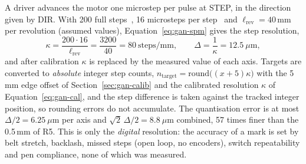 A driver advances the motor one microstep per pulse at STEP, in the direction given by DIR.
With 200 full steps~\cite{stepperds}, 16 microsteps per step~\cite{a4988ds} and $\ell_{\mathrm{rev}}=40$\,mm per revolution (assumed values), Equation~\ref{eq:gan-spm} gives the step resolution,
\begin{equation}
\kappa=\frac{200\cdot16}{\ell_{\mathrm{rev}}}=\frac{3200}{40}=80\ \mathrm{steps/mm},\qquad\Delta=\frac1\kappa=12.5\ \mu\mathrm{m},
\label{eq:gan-spm}
\end{equation}
and after calibration $\kappa$ is replaced by the measured value of each axis.
Targets are converted to \emph{absolute} integer step counts, $n_{\mathrm{target}}=\mathrm{round}\bigl((x+5)\kappa\bigr)$ with the 5\,mm edge offset of Section~\ref{sec:gan-calib} and the calibrated resolution $\kappa$ of Equation~\ref{eq:gan-cal}, and the step difference is taken against the tracked integer position, so rounding errors do not accumulate.
The quantisation error is at most $\Delta/2=6.25\ \mu$m per axis and $\sqrt2\,\Delta/2=8.8\ \mu$m combined, 57 times finer than the 0.5\,mm of R5.
This is only the \emph{digital} resolution: the accuracy of a mark is set by belt stretch, backlash, missed steps (open loop, no encoders), switch repeatability and pen compliance, none of which was measured.

